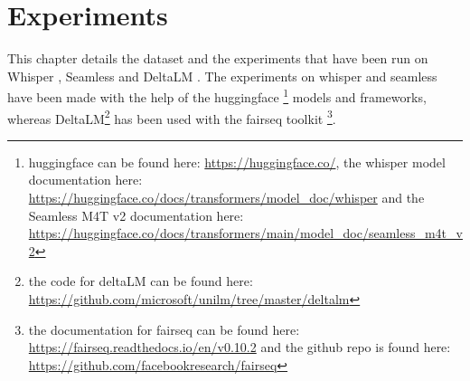 
\chapter{Experiments}
\label{ch:experiment}
This chapter details the dataset and the experiments that have been run on Whisper \cite{radford2022robust}, Seamless \cite{seamless2023} and DeltaLM \cite{ma2021deltalm}.
The experiments on whisper and seamless have been made with the help of the huggingface \cite{huggingfaceseamless}\cite{huggingfacewhisper}\footnote{huggingface can be found here: \url{https://huggingface.co/}, the whisper model documentation here: \url{https://huggingface.co/docs/transformers/model_doc/whisper} and the Seamless M4T v2 documentation here: \url{https://huggingface.co/docs/transformers/main/model_doc/seamless_m4t_v2}} models and frameworks, whereas DeltaLM\footnote{the code for deltaLM can be found here: \url{https://github.com/microsoft/unilm/tree/master/deltalm}} has been used with the fairseq toolkit \cite{ott2019fairseqfastextensibletoolkit}\footnote{the documentation for fairseq can be found here: \url{https://fairseq.readthedocs.io/en/v0.10.2} and the github repo is found here: \url{https://github.com/facebookresearch/fairseq}}.

